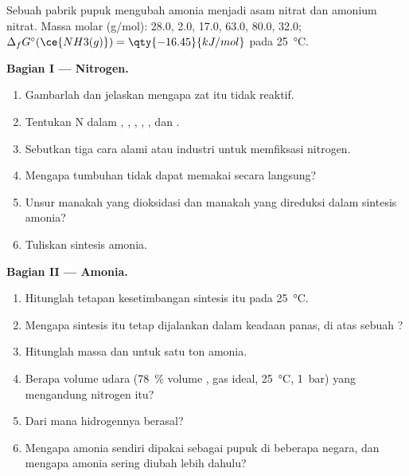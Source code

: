\begin{problem}
\label{pb:b1:p-block-13-15:1}
Sebuah pabrik pupuk mengubah amonia menjadi asam nitrat dan amonium
nitrat. Massa molar (\unit{g/mol}):  28.0,  2.0, 
17.0,  63.0,  80.0,  32.0;
$\Delta_f G^\circ(\ce{NH3(g)}) = \qty{-16.45}{kJ/mol}$ pada
\qty{25}{\celsius}.

\medskip
\noindent\textbf{Bagian I --- Nitrogen.}
\begin{enumerate}
  \item Gambarlah   dan jelaskan mengapa zat itu
        tidak reaktif.
  \item Tentukan  N dalam , , ,
        , , dan .
  \item Sebutkan tiga cara alami atau industri untuk memfiksasi nitrogen.
  \item Mengapa tumbuhan tidak dapat memakai  secara langsung?
  \item Unsur manakah yang dioksidasi dan manakah yang direduksi dalam
        sintesis amonia?
  \item Tuliskan sintesis amonia.
\end{enumerate}

\medskip
\noindent\textbf{Bagian II --- Amonia.}
\begin{enumerate}[resume]
  \item Hitunglah tetapan kesetimbangan sintesis itu pada
        \qty{25}{\celsius}.
  \item Mengapa sintesis itu tetap dijalankan dalam keadaan panas, di atas
        sebuah ?
  \item Hitunglah massa  dan  untuk satu ton amonia.
  \item Berapa volume udara (\qty{78}{\percent} volume , gas ideal,
        \qty{25}{\celsius}, \qty{1}{bar}) yang mengandung nitrogen itu?
  \item Dari mana hidrogennya berasal?
  \item Mengapa amonia sendiri dipakai sebagai pupuk di beberapa negara,
        dan mengapa amonia sering diubah lebih dahulu?
\end{enumerate}


\end{problem}
